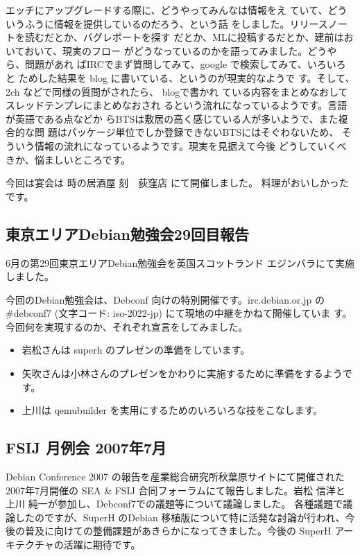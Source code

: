 \documentclass[mingoth,a4paper]{jsarticle}
\begin{document}
エッチにアップグレードする際に、どうやってみんなは情報をえ
ていて、どういうふうに情報を提供しているのだろう、という話
をしました。リリースノートを読むだとか、バグレポートを探す
だとか、MLに投稿するだとか、建前はおいておいて、現実のフロー
がどうなっているのかを語ってみました。どうやら、問題があれ
ばIRCでまず質問してみて、google で検索してみて、いろいろと
ためした結果を blog に書いている、というのが現実的なようで
す。そして、2ch などで同様の質問がされたら、 blogで書かれ
ている内容をまとめなおしてスレッドテンプレにまとめなおされ
るという流れになっているようです。言語が英語である点などか
らBTSは敷居の高く感じている人が多いようで、また複合的な問
題はパッケージ単位でしか登録できないBTSにはそぐわないため、
そういう情報の流れになっているようです。現実を見据えて今後
どうしていくべきか、悩ましいところです。

今回は宴会は
時の居酒屋  刻　荻窪店
にて開催しました。
料理がおいしかったです。

\subsection{東京エリアDebian勉強会29回目報告}

6月の第29回東京エリアDebian勉強会を英国スコットランド エジンバラにて実施
しました。

今回のDebian勉強会は、Debconf 向けの特別開催です。irc.debian.or.jp の 
\#debconf7 (文字コード: iso-2022-jp) にて現地の中継をかねて開催していま
す。今回何を実現するのか、それぞれ宣言をしてみました。

\begin{itemize}
 \item 岩松さんは superh のプレゼンの準備をしています。
 \item 矢吹さんは小林さんのプレゼンをかわりに実施するために準備をするようです。
 \item 上川は qemubuilder を実用にするためのいろいろな技をこなします。
\end{itemize}

\subsection{FSIJ 月例会 2007年7月}

Debian Conference 2007 の報告を産業総合研究所秋葉原サイトにて開催された
2007年7月開催の SEA \& FSIJ 合同フォーラムにて報告しました。岩松 信洋と
上川 純一が参加し、Debconf7での議題等について議論しました。 各種議題で議
論したのですが、SuperH のDebian 移植版について特に活発な討論が行われ、今
後の普及に向けての整備課題があきらかになってきました。今後の SuperH アー
キテクチャの活躍に期待です。
\end{document}
